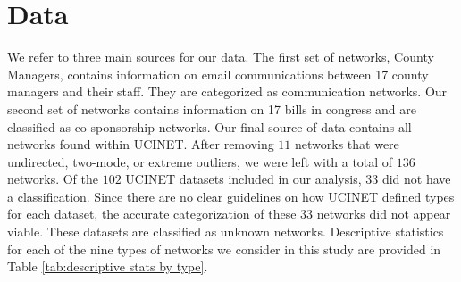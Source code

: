 \documentclass[3p,times]{elsarticle}
\begin{document}


















	
	
\section{Data}
\label{sec:data}
We refer to three main sources for our data. The first set of networks, County Managers, contains information on email communications between 17 county managers and their staff. They are categorized as communication networks. Our second set of networks contains information on 17 bills in congress and are classified as co-sponsorship networks. Our final source of data contains all networks found within UCINET. After removing $11$ networks that were undirected, two-mode, or extreme outliers, we were left with a total of $136$ networks. Of the $102$ UCINET datasets included in our analysis, $33$ did not have a classification. Since there are no clear guidelines on how UCINET defined types for each dataset, the accurate categorization of these $33$ networks did not appear viable. These datasets are classified as unknown networks. Descriptive statistics for each of the nine types of networks we consider in this study are provided in Table \ref{tab:descriptive stats by type}.  
\end{document}
